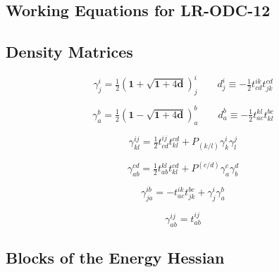 \begin{subappendices}
\section{Working Equations for LR-ODC-12}


\subsection{Density Matrices}

\begin{equation}
    \gamma^i_j
    =
    \tfrac{1}{2}
    (
        \mathbf{1}
        +
        \sqrt{\mathbf{1} + 4\mathbf{d}}
    )_j^i
    \qquad
    d_j^i
    \equiv
    -
    \tfrac{1}{2}
    t_{cd}^{ik}
    t_{jk}^{cd}
\end{equation}

\begin{equation}
    \gamma^b_a
    =
    \tfrac{1}{2}
    (
        \mathbf{1}
        -
        \sqrt{\mathbf{1} + 4\mathbf{d}}
    )_a^b
    \qquad
    d_a^b
    \equiv
    -
    \tfrac{1}{2}
    t_{ac}^{kl}
    t_{kl}^{bc}
\end{equation}

\begin{equation}
    \gamma^{ij}_{kl}
    =
    \tfrac{1}{2}
    t_{cd}^{ij}
    t_{kl}^{cd}
    +
    P_{(k/l)}
    \gamma^i_k
    \gamma^j_l
\end{equation}

\begin{equation}
    \gamma_{ab}^{cd}
    =
    \tfrac{1}{2}
    t_{ab}^{kl}
    t_{kl}^{cd}
    +
    P^{(c/d)}
    \gamma_a^c
    \gamma_b^d
\end{equation}

\begin{equation}
    \gamma_{ja}^{ib}
    =
    -
    t_{ac}^{ik}
    t_{jk}^{bc}
    +
    \gamma^i_j
    \gamma_a^b
\end{equation}

\begin{equation}
    \gamma_{ab}^{ij}
    =
    t_{ab}^{ij}
\end{equation}


\subsection{Blocks of the Energy Hessian}


\end{subappendices}
